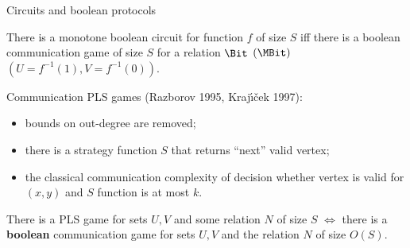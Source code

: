 \begin{frame}{Circuits and boolean protocols}

    \begin{theorem}[Pudl{\'{a}}k 2010, S 2017]
        There is a {\color{blue} monotone} boolean circuit for function $f$ of size $S$ iff there is a
        boolean communication game of size $S$ for a relation $\Bit$ {\color{blue}$(\MBit)$} $(U =
        f^{-1}(1), V = f^{-1}(0))$.
    \end{theorem}

    \pause
    Communication PLS games (Razborov 1995, Kraj{\'{\i}}{\v{c}}ek 1997):
    \begin{itemize}
        \item bounds on out-degree are removed;
        \item there is a strategy function $S$ that returns ``next'' valid vertex;
        \item the classical communication complexity of decision whether vertex is valid for $(x, y)$ and
            $S$ function is at most $k$.
    \end{itemize}

    \pause
    \begin{theorem}
        There is a PLS game for sets $U, V$ and some relation $N$ of size $S$ $\Leftrightarrow$ there is
        a \textbf{boolean} communication game for sets $U, V$ and the relation $N$ of size $O(S)$.
    \end{theorem}

\end{frame}



